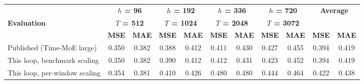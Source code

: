 \begin{tabular}{@{}lcccccccccc@{}}
\toprule
 & \multicolumn{2}{c}{\textbf{$h$ = 96}} & \multicolumn{2}{c}{\textbf{$h$ = 192}} & \multicolumn{2}{c}{\textbf{$h$ = 336}} & \multicolumn{2}{c}{\textbf{$h$ = 720}} & \multicolumn{2}{c}{\textbf{Average}} \\
\textbf{Evaluation} & \multicolumn{2}{c}{\textbf{$T$ = 512}} & \multicolumn{2}{c}{\textbf{$T$ = 1024}} & \multicolumn{2}{c}{\textbf{$T$ = 2048}} & \multicolumn{2}{c}{\textbf{$T$ = 3072}} &  &  \\
\cmidrule(lr){2-3}\cmidrule(lr){4-5}\cmidrule(lr){6-7}\cmidrule(lr){8-9}\cmidrule(lr){10-11}
 & \textbf{MSE} & \textbf{MAE} & \textbf{MSE} & \textbf{MAE} & \textbf{MSE} & \textbf{MAE} & \textbf{MSE} & \textbf{MAE} & \textbf{MSE} & \textbf{MAE} \\
\midrule
Published (Time-MoE large) & 0.350 & 0.382 & 0.388 & 0.412 & 0.411 & 0.430 & 0.427 & 0.455 & 0.394 & 0.419 \\
This loop, benchmark scaling & 0.350 & 0.382 & 0.390 & 0.412 & 0.412 & 0.431 & 0.423 & 0.452 & 0.394 & 0.419 \\
\midrule
This loop, per-window scaling & 0.354 & 0.381 & 0.410 & 0.426 & 0.480 & 0.480 & 0.444 & 0.464 & 0.422 & 0.438 \\
\bottomrule
\end{tabular}
